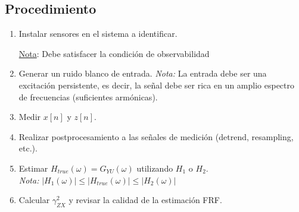 

\subsection{Procedimiento}

\begin{enumerate}

    \item Instalar sensores en el sistema a identificar.

           \underline{Nota}: Debe satisfacer la condición de observabilidad
    
        
    \item Generar un ruido blanco de entrada. \emph{Nota:} La entrada debe ser una excitación persistente, es decir, la señal debe ser rica en un amplio espectro de frecuencias (suficientes armónicas).
    
    \item Medir $x[n]$ y $z[n]$.

    \item Realizar postprocesamiento a las señales de medición (detrend, resampling, etc.).
    
    \item Estimar $H_{true}(\omega) = G_{YU}(\omega)$ utilizando $H_1$ o $H_2$.\\

    \emph{Nota:} $|H_1(\omega)| \leq |H_{true}(\omega)| \leq |H_2(\omega)|$

    \item Calcular $\gamma_{ZX}^2$ y revisar la calidad de la estimación FRF.
    
        
\end{enumerate}


